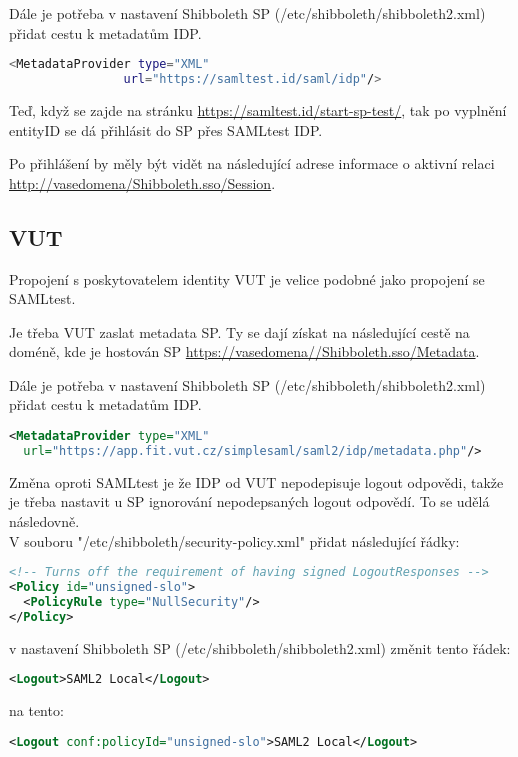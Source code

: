 Dále je potřeba v nastavení Shibboleth SP (/etc/shibboleth/shibboleth2.xml) přidat cestu k metadatům IDP.
\begin{lstlisting}[language=Bash]
 <MetadataProvider type="XML"
                url="https://samltest.id/saml/idp"/>
\end{lstlisting}

Teď, když se zajde na stránku \url{https://samltest.id/start-sp-test/}, tak po vyplnění entityID se dá přihlásit do SP přes SAMLtest IDP.

Po přihlášení by měly být vidět na následující adrese informace o aktivní relaci \url{http://vasedomena/Shibboleth.sso/Session}.

\subsection{VUT}
Propojení s poskytovatelem identity VUT je velice podobné jako propojení se SAMLtest.



Je třeba VUT zaslat metadata SP. Ty se dají získat na následující cestě na doméně, kde je hostován SP \url{https://vasedomena//Shibboleth.sso/Metadata}.

Dále je potřeba v nastavení Shibboleth SP (/etc/shibboleth/shibboleth2.xml) přidat cestu k metadatům IDP.
\begin{lstlisting}[language=XML]
 <MetadataProvider type="XML"
  url="https://app.fit.vut.cz/simplesaml/saml2/idp/metadata.php"/>
\end{lstlisting}

Změna oproti SAMLtest je že IDP od VUT nepodepisuje logout odpovědi, takže je třeba nastavit u SP ignorování nepodepsaných logout odpovědí. To se udělá následovně.\\
V souboru  "/etc/shibboleth/security-policy.xml" přidat následující řádky:
\begin{lstlisting}[language=XML]
<!-- Turns off the requirement of having signed LogoutResponses -->
<Policy id="unsigned-slo">
  <PolicyRule type="NullSecurity"/>
</Policy>
\end{lstlisting}

 v nastavení Shibboleth SP (/etc/shibboleth/shibboleth2.xml)
 změnit tento řádek:
 \begin{lstlisting}[language=XML]
 <Logout>SAML2 Local</Logout>
\end{lstlisting}
na tento:
 \begin{lstlisting}[language=XML]
 <Logout conf:policyId="unsigned-slo">SAML2 Local</Logout>
\end{lstlisting}

